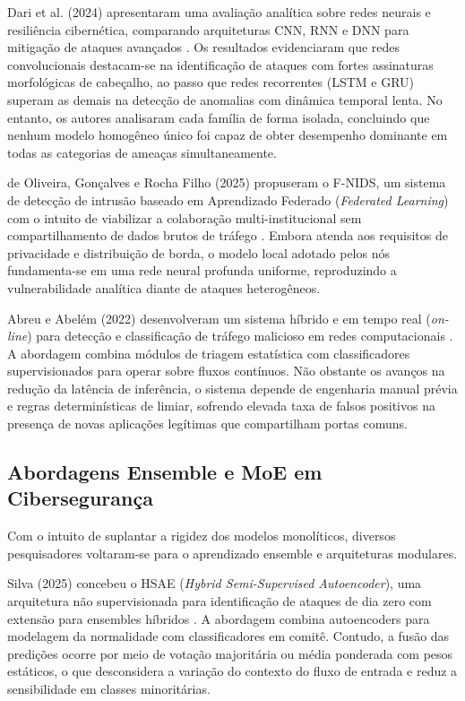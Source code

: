 Dari et al. (2024) apresentaram uma avaliação analítica sobre redes neurais e resiliência cibernética, comparando arquiteturas CNN, RNN e DNN para mitigação de ataques avançados \cite{neuralcyber2025}. Os resultados evidenciaram que redes convolucionais destacam-se na identificação de ataques com fortes assinaturas morfológicas de cabeçalho, ao passo que redes recorrentes (LSTM e GRU) superam as demais na detecção de anomalias com dinâmica temporal lenta. No entanto, os autores analisaram cada família de forma isolada, concluindo que nenhum modelo homogêneo único foi capaz de obter desempenho dominante em todas as categorias de ameaças simultaneamente.

de Oliveira, Gonçalves e Rocha Filho (2025) propuseram o F-NIDS, um sistema de detecção de intrusão baseado em Aprendizado Federado (\emph{Federated Learning}) com o intuito de viabilizar a colaboração multi-institucional sem compartilhamento de dados brutos de tráfego \cite{fnids2025}. Embora atenda aos requisitos de privacidade e distribuição de borda, o modelo local adotado pelos nós fundamenta-se em uma rede neural profunda uniforme, reproduzindo a vulnerabilidade analítica diante de ataques heterogêneos.

Abreu e Abelém (2022) desenvolveram um sistema híbrido e em tempo real (\emph{on-line}) para detecção e classificação de tráfego malicioso em redes computacionais \cite{sistema2022}. A abordagem combina módulos de triagem estatística com classificadores supervisionados para operar sobre fluxos contínuos. Não obstante os avanços na redução da latência de inferência, o sistema depende de engenharia manual prévia e regras determinísticas de limiar, sofrendo elevada taxa de falsos positivos na presença de novas aplicações legítimas que compartilham portas comuns.

\subsection{Abordagens Ensemble e MoE em Cibersegurança}
\label{subsec:correlatos_ensemble_moe}

Com o intuito de suplantar a rigidez dos modelos monolíticos, diversos pesquisadores voltaram-se para o aprendizado ensemble e arquiteturas modulares.

Silva (2025) concebeu o HSAE (\emph{Hybrid Semi-Supervised Autoencoder}), uma arquitetura não supervisionada para identificação de ataques de dia zero com extensão para ensembles híbridos \cite{hsae2025}. A abordagem combina autoencoders para modelagem da normalidade com classificadores em comitê. Contudo, a fusão das predições ocorre por meio de votação majoritária ou média ponderada com pesos estáticos, o que desconsidera a variação do contexto do fluxo de entrada e reduz a sensibilidade em classes minoritárias.

